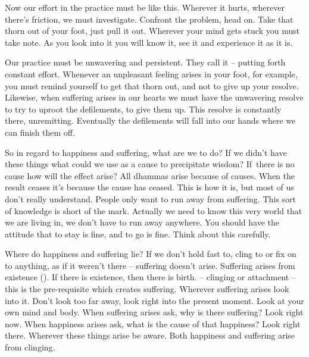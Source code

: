 Now our effort in the practice must be like this. Wherever it hurts, wher\-ever there's friction, we must investigate. Confront the problem, head on. Take that thorn out of your foot, just pull it out. Wherever your mind gets stuck you must take note. As you look into it you will know it, see it and experience it as it is. 

Our practice must be unwavering and persistent. They call it  -- putting forth constant effort. Whenever an unpleasant feeling arises in your foot, for example, you must remind yourself to get that thorn out, and not to give up your resolve. Likewise, when suffering arises in our hearts we must have the unwavering resolve to try to uproot the defilements, to give them up. This resolve is constantly there, unremitting. Eventually the defilements will fall into our hands where we can finish them off. 

So in regard to happiness and suffering, what are we to do? If we didn't have these things what could we use as a cause to precipitate wisdom? If~there is no cause how will the effect arise? All dhammas arise because of causes. When the result ceases it's because the cause has ceased. This is how it is, but most of us don't really understand. People only want to run away from suffering. This sort of knowledge is short of the mark. Actually we need to know this very world that we are living in, we don't have to run away anywhere. You should have the attitude that to stay is fine, and to go is fine. Think about this carefully. 

Where do happiness and suffering lie? If we don't hold fast to, cling to or fix on to anything, as if it weren't there -- suffering doesn't arise. Suffering arises from existence (). If there is existence, then there is birth.  -- clinging or attachment -- this is the pre-requisite which creates suffering. Wherever suffering arises look into it. Don't look too far away, look right into the present moment. Look at your own mind and body. When suffering arises ask, why is there suffering? Look right now. When happiness arises ask, what is the cause of that happiness? Look right there. Wherever these things arise be aware. Both happiness and suffering arise from clinging. 


